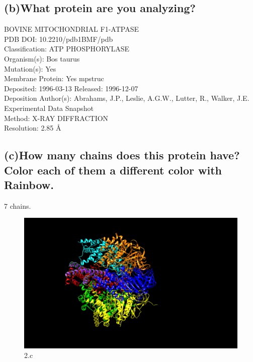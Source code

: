 \documentclass[a4paper, 12pt, one column]{article}
\begin{document}
\subsection*{(b)What protein are you analyzing?}
BOVINE MITOCHONDRIAL F1-ATPASE\\
PDB DOI: 10.2210/pdb1BMF/pdb\\
Classification: ATP PHOSPHORYLASE\\
Organism(s): Bos taurus\\
Mutation(s): Yes \\
Membrane Protein: Yes  mpstruc\\

Deposited: 1996-03-13 Released: 1996-12-07 \\
Deposition Author(s): Abrahams, J.P., Leslie, A.G.W., Lutter, R., Walker, J.E.\\
Experimental Data Snapshot\\

Method: X-RAY DIFFRACTION\\
Resolution: 2.85 Å\\

\subsection*{(c)How many chains does this protein have? Color each of them a different color with
Rainbow.}
7 chains.\\
\begin{figure}[H]
    \centering
    \includegraphics[width=.8\linewidth]{2_c.png}
    \caption{2.c}
    \label{fig:2_c.png}
\end{figure}
\end{document}
